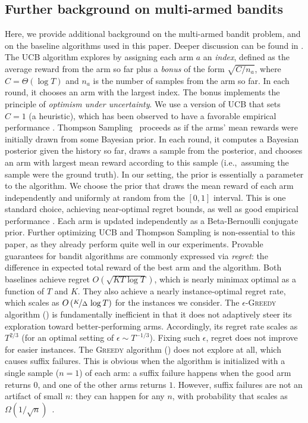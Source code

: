 \documentclass[11pt]{article}
\newcommand{\ucb}{\textsc{UCB}\xspace}
\newcommand{\greedy}{\textsc{Greedy}\xspace}
\newcommand{\EpsGreedy}{$\epsilon$-\textsc{Greedy}\xspace}
\newcommand{\eps}{\epsilon}
\newcommand{\ie}{{i.e.,~\xspace}}
\newcommand{\eg}{{e.g.,~\xspace}}
\begin{document}
\subsection{Further background on multi-armed bandits}
\label{sec:bg}
Here, we provide additional background on the multi-armed bandit problem, and on the baseline algorithms used in this paper. Deeper discussion can be found in \citet{Bubeck-survey12,slivkins-MABbook,LS19bandit-book}.
The \ucb algorithm \citep{bandits-ucb1} explores by assigning each arm $a$ an \emph{index}, defined as the average reward from the arm so far plus a \emph{bonus} of the form $\sqrt{C/n_a}$, where $C = \Theta(\log T)$ and $n_a$ is the number of samples from the arm so far. In each round, it chooses an arm with the largest index. The bonus implements the principle of \emph{optimism under uncertainty}. We use a version of \ucb that sets $C=1$ (a heuristic), which has been observed to have a favorable empirical performance \citep[\eg][]{ZoomingRBA-icml10,RepeatedPA-ec14}.
Thompson Sampling~\citep[][for a survey]{Thompson-1933,TS-survey-FTML18} proceeds as if the arms' mean rewards were initially drawn from some Bayesian prior. In each round, it computes a Bayesian posterior given the history so far, draws a sample from the posterior, and chooses an arm with largest mean reward according to this sample (\ie assuming the sample were the ground truth).
In our setting, the prior is essentially a parameter to the algorithm. We choose the prior that draws the mean reward of each arm independently and uniformly at random from the $[0,1]$ interval. This is one standard choice, achieving near-optimal regret bounds, as well as good empirical performance \citep{Kaufmann-alt12,Shipra-colt12,Shipra-aistats13-JACM}. Each arm is updated independently as a Beta-Bernoulli conjugate prior. Further optimizing \ucb and Thompson Sampling is non-essential to this paper, as they already perform quite well in our experiments.
Provable guarantees for bandit algorithms are commonly expressed via \emph{regret}: the difference in expected total reward of the best arm and the algorithm. Both baselines achieve regret $O(\sqrt{KT\log T})$, which is nearly minimax optimal as a function of $T$ and $K$. They also achieve a nearly instance-optimal regret rate, which scales as $O\left(\nicefrac{K}{\Delta}\,\log T\right)$ for the instances we consider.
The \EpsGreedy algorithm () is fundamentally inefficient in that it does not adaptively steer its exploration toward better-performing arms. Accordingly, its regret rate scales as $T^{2/3}$ (for an optimal setting of $\eps\sim T^{-1/3}$). Fixing such $\eps$, regret does not improve for easier instances.
The \greedy algorithm () does not explore at all, which causes suffix failures. This is obvious when the algorithm is initialized with a single sample ($n=1$) of each arm: a suffix failure happens when the good arm returns $0$, and one of the other arms returns $1$. However, suffix failures are not an artifact of small $n$: they can happen for any $n$, with probability that scales as $\Omega(1/\sqrt{n})$~\citep{BSL-myopic23}.
\end{document}
